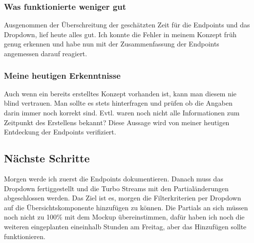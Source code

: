 \subsubsection*{Was funktionierte weniger gut}
Ausgenommen der Überschreitung der geschätzten Zeit für die Endpoints und das Dropdown, lief heute alles gut.
Ich konnte die Fehler in meinem Konzept früh genug erkennen und habe nun mit der Zusammenfassung der Endpoints angemessen darauf reagiert.  

\subsubsection*{Meine heutigen Erkenntnisse}
Auch wenn ein bereits erstelltes Konzept vorhanden ist, kann man diesem nie blind vertrauen. Man sollte es stets hinterfragen und prüfen
ob die Angaben darin immer noch korrekt sind. Evtl. waren noch nicht alle Informationen zum Zeitpunkt des Erstellens bekannt? Diese Aussage wird von meiner 
heutigen Entdeckung der Endpoints verifiziert.

\subsection*{Nächste Schritte}
Morgen werde ich zuerst die Endpoints dokumentieren. Danach muss das Dropdown fertiggestellt und die Turbo Streams mit den Partialänderungen abgeschlossen werden. 
Das Ziel ist es, morgen die Filterkriterien per Dropdown auf die Übersichtskomponente hinzufügen zu können. Die Partials an sich müssen noch nicht zu 100\% mit dem Mockup
übereinstimmen, dafür haben ich noch die weiteren eingeplanten eineinhalb Stunden am Freitag, aber das Hinzufügen sollte funktionieren.

\pagebreak
